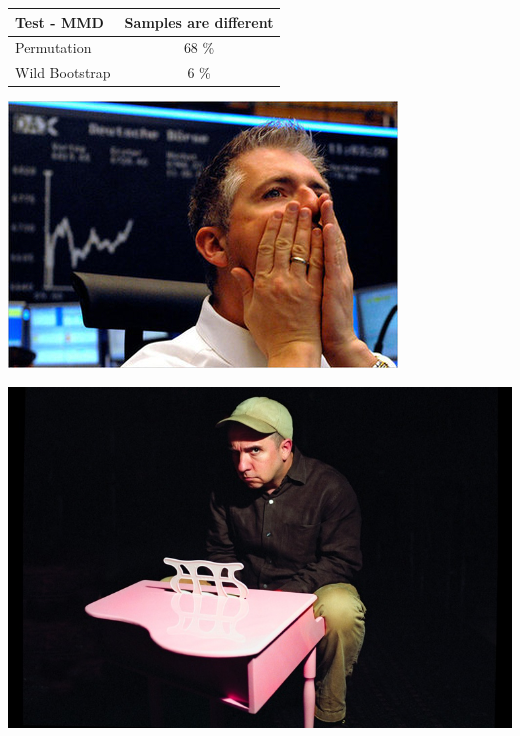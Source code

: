 \documentclass[landscape,a0]{a0poster_csml_v2}
\begin{document}
\begin{poster}
\begin{PosterColumn}
\begin{minipage}[c]{0.4\textwidth}
\begin{center}
\begin{tabular}{ l | c  }
  \hline                       
  Test - MMD  &  Samples are different   \\  
    \hline   
  Permutation  & 68 \%   \\
    \hline   
  Wild Bootstrap    & 6 \%   \\
  \hline  
\end{tabular}
\end{center}
\end{minipage}
\begin{minipage}[c]{0.6\textwidth}
\vspace{3.3cm}
\begin{minipage}[c]{0.45\textwidth}
\includegraphics[width=\textwidth]{../img/sad-guys-on-trading-floors.jpg}
\end{minipage}  
\begin{minipage}[c]{0.45\textwidth}
\includegraphics[width=\textwidth]{../img/strange_powers_01.jpg} 

\end{minipage}
\end{minipage}
\end{PosterColumn}
\end{poster}
\end{document}
